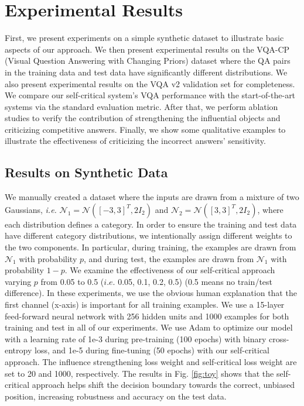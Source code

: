 \documentclass{article}
\begin{document}
\section{Experimental Results}
First, we present experiments on a simple synthetic dataset to illustrate basic aspects of our approach. We then present experimental results on the VQA-CP (Visual Question Answering with Changing Priors) \cite{vqa-cp} dataset where the QA pairs in the training data and test data have significantly different distributions. We also present experimental results on the VQA v2 validation set for completeness. We compare our self-critical system's VQA performance with the start-of-the-art systems via the standard evaluation metric. After that, we perform ablation studies to verify the contribution of strengthening the influential objects and criticizing competitive answers. Finally, we show some qualitative examples to illustrate the effectiveness of criticizing the incorrect answers' sensitivity.


\subsection{Results on Synthetic Data}
We manually created a dataset where the inputs are drawn from a mixture of two Gaussians, \textit{i.e.} $\mathcal{N}_1 = \mathcal{N}([-3,3]^T, 2I_2)$ and $\mathcal{N}_2 = \mathcal{N}([3,3]^T, 2I_2)$, where each distribution defines a category. In order to ensure the training and test data have  different category distributions, we intentionally assign different weights to the two components. In particular, during training, the examples are drawn from $\mathcal{N}_1$ with probability $p$, and during test, the examples are drawn from $\mathcal{N}_1$ with probability $1-p$. We examine the effectiveness of our self-critical approach varying $p$ from 0.05 to 0.5 ($i.e.$ 0.05, 0.1, 0.2, 0.5) (0.5 means no train/test difference). In these experiments, we use the obvious human explanation that the first channel (x-axis) is important for all training examples. We use a 15-layer feed-forward neural network with 256 hidden units and 1000 examples for both training and test in all of our experiments. We use Adam to optimize our model with a learning rate of 1e-3 during pre-training (100 epochs) with binary cross-entropy loss, and 1e-5 during fine-tuning (50 epochs) with our self-critical approach. The influence strengthening loss weight and self-critical loss weight are set to 20 and 1000, respectively. The results in Fig. \ref{fig:toy} shows that the self-critical approach helps shift the decision boundary towards the correct, unbiased position, increasing robustness and accuracy on the test data.
\end{document}
